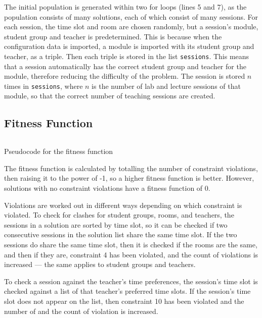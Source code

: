 The initial population is generated within two for loops (lines 5 and 7), as the
population consists of many solutions, each of which consist of many sessions.
For each session, the time slot and room are chosen randomly, but a session's 
module, student group and teacher is predetermined.
This is because when the configuration data is imported, a module is imported 
with its student group and teacher, as a triple.
Then each triple is stored in the list \verb|sessions|.
This means that a session automatically has the correct student group and 
teacher for the module, therefore reducing the difficulty of the problem.
The session is stored \( n \) times in \verb|sessions|, where \( n \) is the 
number of lab and lecture sessions of that module, so that the correct number 
of teaching sessions are created.

\newpage

\subsection{Fitness Function}

\begin{listing}[!ht]
	\inputminted[linenos, fontsize=\footnotesize]{text}{code/fitness.txt}
	\caption{Pseudocode for the fitness function}
	\label{listing:fitness}
\end{listing}

The fitness function is calculated by totalling the number of constraint 
violations, then raising it to the power of -1, so a higher fitness function is 
better.
However, solutions with no constraint violations have a fitness function of 0.

Violations are worked out in different ways depending on which constraint is
violated.
To check for clashes for student groups, rooms, and teachers, the sessions in a 
solution are sorted by time slot, so it can be checked if two consecutive 
sessions in the solution list share the same time slot.
If the two sessions do share the same time slot, then it is checked if the rooms
are the same, and then if they are, constraint 4 has been violated, and the 
count of violations is increased --- the same applies to student groups and 
teachers.

To check a session against the teacher's time preferences, the session's time 
slot is checked against a list of that teacher's preferred time slots.
If the session's time slot does not appear on the list, then constraint 10 has 
been violated and the number of and the count of violation is increased.

